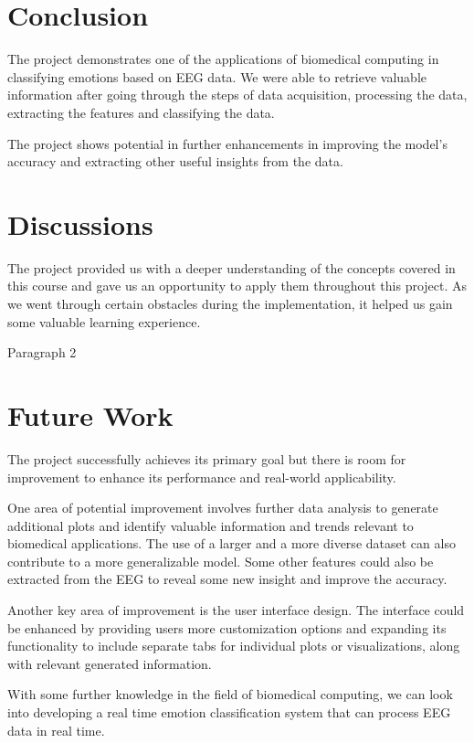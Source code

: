 \documentclass[12pt, a4paper]{report}
\begin{document}
\section{Conclusion}
The project demonstrates one of the applications of biomedical computing in classifying emotions based on EEG data. We were able to retrieve valuable information after going through the steps of data acquisition, processing the data, extracting the features and classifying the data.

The project shows potential in further enhancements in improving the model's accuracy and extracting other useful insights from the data.


\section{Discussions}
The project provided us with a deeper understanding of the concepts covered in this course and gave us an opportunity to apply them throughout this project. As we went through certain obstacles during the implementation, it helped us gain some valuable learning experience. 

Paragraph 2

\section{Future Work}
The project successfully achieves its primary goal but there is room for improvement to enhance its performance and real-world applicability.

One area of potential improvement involves further data analysis to generate additional plots and identify valuable information and trends relevant to biomedical applications. The use of a larger and a more diverse dataset can also contribute to a more generalizable model. Some other features could also be extracted from the EEG to reveal some new insight and improve the accuracy.

Another key area of improvement is the user interface design. The interface could be enhanced by providing users more customization options and expanding its functionality to include separate tabs for individual plots or visualizations, along with relevant generated information.

With some further knowledge in the field of biomedical computing, we can look into developing a real time emotion classification system that can process EEG data in real time.
\end{document}
